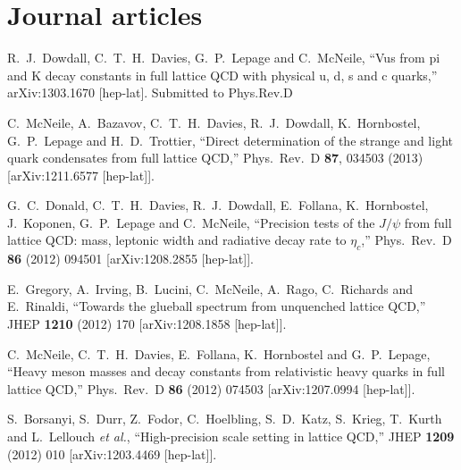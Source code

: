 \section{Journal articles}

\begin{thebibliography}{130}


  R.~J.~Dowdall, C.~T.~H.~Davies, G.~P.~Lepage and C.~McNeile,
  ``Vus from pi and K decay constants in full lattice QCD with
  physical u, d, s and c quarks,''
  arXiv:1303.1670 [hep-lat]. Submitted to Phys.Rev.D

  C.~McNeile, A.~Bazavov, C.~T.~H.~Davies, R.~J.~Dowdall,
  K.~Hornbostel, G.~P.~Lepage and H.~D.~Trottier,
  ``Direct determination of the strange and light quark condensates
  from full lattice QCD,''
  Phys.\ Rev.\ D {\bf 87}, 034503 (2013)
  [arXiv:1211.6577 [hep-lat]].


  G.~C.~Donald, C.~T.~H.~Davies, R.~J.~Dowdall, E.~Follana,
  K.~Hornbostel, J.~Koponen, G.~P.~Lepage and C.~McNeile,
  ``Precision tests of the $J/{\psi}$ from full lattice QCD: mass,
  leptonic width and radiative decay rate to ${\eta}_c$,''
  Phys.\ Rev.\ D {\bf 86} (2012) 094501
  [arXiv:1208.2855 [hep-lat]].

  E.~Gregory, A.~Irving, B.~Lucini, C.~McNeile, A.~Rago, C.~Richards
  and E.~Rinaldi,
  ``Towards the glueball spectrum from unquenched lattice QCD,''
  JHEP {\bf 1210} (2012) 170
  [arXiv:1208.1858 [hep-lat]].

  C.~McNeile, C.~T.~H.~Davies, E.~Follana, K.~Hornbostel and
  G.~P.~Lepage,
  ``Heavy meson masses and decay constants from relativistic heavy
  quarks in full lattice QCD,''
  Phys.\ Rev.\ D {\bf 86} (2012) 074503
  [arXiv:1207.0994 [hep-lat]].

 S.~Borsanyi, S.~Durr, Z.~Fodor, C.~Hoelbling, S.~D.~Katz, S.~Krieg,
 T.~Kurth and L.~Lellouch {\it et al.},
  ``High-precision scale setting in lattice QCD,''
  JHEP {\bf 1209} (2012) 010
  [arXiv:1203.4469 [hep-lat]].



\end{thebibliography}
